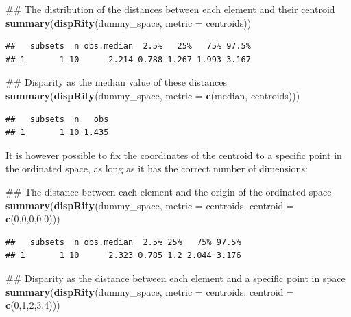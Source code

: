 \documentclass[]{book}
\newenvironment{Shaded}{\begin{snugshade}}{\end{snugshade}}
\newcommand{\KeywordTok}[1]{\textcolor[rgb]{0.13,0.29,0.53}{\textbf{#1}}}
\newcommand{\DataTypeTok}[1]{\textcolor[rgb]{0.13,0.29,0.53}{#1}}
\newcommand{\DecValTok}[1]{\textcolor[rgb]{0.00,0.00,0.81}{#1}}
\newcommand{\NormalTok}[1]{#1}
\theoremstyle{definition}
\theoremstyle{definition}
\theoremstyle{remark}
\begin{document}
\begin{Shaded}
\begin{Highlighting}[]
\NormalTok{## The distribution of the distances between each element and their centroid}
\KeywordTok{summary}\NormalTok{(}\KeywordTok{dispRity}\NormalTok{(dummy_space, }\DataTypeTok{metric =}\NormalTok{ centroids))}
\end{Highlighting}
\end{Shaded}

\begin{verbatim}
##   subsets  n obs.median  2.5%   25%   75% 97.5%
## 1       1 10      2.214 0.788 1.267 1.993 3.167
\end{verbatim}

\begin{Shaded}
\begin{Highlighting}[]
\NormalTok{## Disparity as the median value of these distances}
\KeywordTok{summary}\NormalTok{(}\KeywordTok{dispRity}\NormalTok{(dummy_space, }\DataTypeTok{metric =} \KeywordTok{c}\NormalTok{(median, centroids)))}
\end{Highlighting}
\end{Shaded}

\begin{verbatim}
##   subsets  n   obs
## 1       1 10 1.435
\end{verbatim}

It is however possible to fix the coordinates of the centroid to a
specific point in the ordinated space, as long as it has the correct
number of dimensions:

\begin{Shaded}
\begin{Highlighting}[]
\NormalTok{## The distance between each element and the origin of the ordinated space}
\KeywordTok{summary}\NormalTok{(}\KeywordTok{dispRity}\NormalTok{(dummy_space, }\DataTypeTok{metric =}\NormalTok{ centroids, }\DataTypeTok{centroid =} \KeywordTok{c}\NormalTok{(}\DecValTok{0}\NormalTok{,}\DecValTok{0}\NormalTok{,}\DecValTok{0}\NormalTok{,}\DecValTok{0}\NormalTok{,}\DecValTok{0}\NormalTok{)))}
\end{Highlighting}
\end{Shaded}

\begin{verbatim}
##   subsets  n obs.median  2.5% 25%   75% 97.5%
## 1       1 10      2.323 0.785 1.2 2.044 3.176
\end{verbatim}

\begin{Shaded}
\begin{Highlighting}[]
\NormalTok{## Disparity as the distance between each element and a specific point in space}
\KeywordTok{summary}\NormalTok{(}\KeywordTok{dispRity}\NormalTok{(dummy_space, }\DataTypeTok{metric =}\NormalTok{ centroids, }\DataTypeTok{centroid =} \KeywordTok{c}\NormalTok{(}\DecValTok{0}\NormalTok{,}\DecValTok{1}\NormalTok{,}\DecValTok{2}\NormalTok{,}\DecValTok{3}\NormalTok{,}\DecValTok{4}\NormalTok{)))}
\end{Highlighting}
\end{Shaded}
\end{document}
